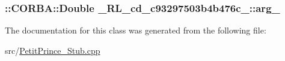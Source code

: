 \subsubsection[{\texorpdfstring{arg\+\_\+1}{arg_1}}]{\setlength{\rightskip}{0pt plus 5cm}\+::C\+O\+R\+B\+A\+::\+Double \+\_\+R\+L\+\_\+cd\+\_\+c93297503b4b476c\+\_\+::arg\+\_}\hypertarget{class__0_r_l__cd__c93297503b4b476c__30000000_a84a569f3464f78e8a47f0c154dd7e164}{}\label{class__0_r_l__cd__c93297503b4b476c__30000000_a84a569f3464f78e8a47f0c154dd7e164}


The documentation for this class was generated from the following file\+:\begin{DoxyCompactItemize}
\item 
src/\hyperlink{_petit_prince___stub_8cpp}{Petit\+Prince\+\_\+\+Stub.\+cpp}\end{DoxyCompactItemize}

